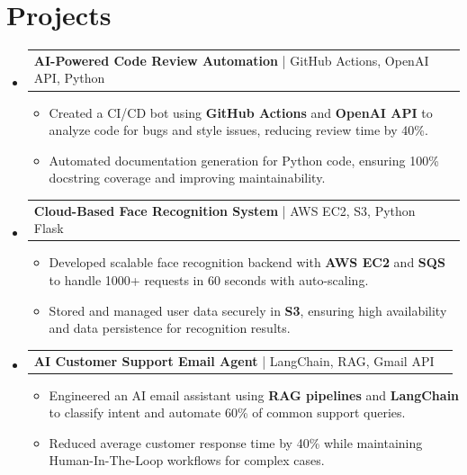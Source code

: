 \documentclass[letterpaper,11pt]{article}
\makeatletter
\newcommand{\resumeItem}[1]{
  \item\footnotesize{
    {#1 \vspace{-2pt}}
  }
}
\newcommand{\resumeProjectHeading}[2]{
    \item
    \begin{tabular*}{1.001\textwidth}{l@{\extracolsep{\fill}}r}
      \small#1 & \textbf{\small #2}\\
    \end{tabular*}\vspace{-7pt}
}
\newcommand{\resumeSubHeadingListStart}{\begin{itemize}[leftmargin=0pt, label={}]}
\newcommand{\resumeSubHeadingListEnd}{\end{itemize}}
\newcommand{\resumeItemListStart}{\begin{itemize}[leftmargin=*]}
\newcommand{\resumeItemListEnd}{\end{itemize}\vspace{-5pt}}
\makeatother
\begin{document}
\section{Projects}
    \vspace{-5pt}
    \resumeSubHeadingListStart
          \resumeProjectHeading
              {\textbf{AI-Powered Code Review Automation} | GitHub Actions, OpenAI API, Python}{}
        \resumeItemListStart
            \resumeItem{Created a CI/CD bot using \textbf{GitHub Actions} and \textbf{OpenAI API} to analyze code for bugs and style issues, reducing review time by 40\%.}
            \resumeItem{Automated documentation generation for Python code, ensuring 100\% docstring coverage and improving maintainability.}
        \resumeItemListEnd
        \vspace{-12pt}
    
    \resumeProjectHeading
        {\textbf{Cloud-Based Face Recognition System} | AWS EC2, S3, Python Flask}{}
        \resumeItemListStart
            \resumeItem{Developed scalable face recognition backend with \textbf{AWS EC2} and \textbf{SQS} to handle 1000+ requests in 60 seconds with auto-scaling.}
            \resumeItem{Stored and managed user data securely in \textbf{S3}, ensuring high availability and data persistence for recognition results.}
        \resumeItemListEnd
          \vspace{-12pt}
      \resumeProjectHeading
          {\textbf{AI Customer Support Email Agent} | LangChain, RAG, Gmail API}{}
          \resumeItemListStart
              \resumeItem{Engineered an AI email assistant using \textbf{RAG pipelines} and \textbf{LangChain} to classify intent and automate 60\% of common support queries.}
              \resumeItem{Reduced average customer response time by 40\% while maintaining Human-In-The-Loop workflows for complex cases.}
          \resumeItemListEnd 
    \resumeSubHeadingListEnd
\end{document}
